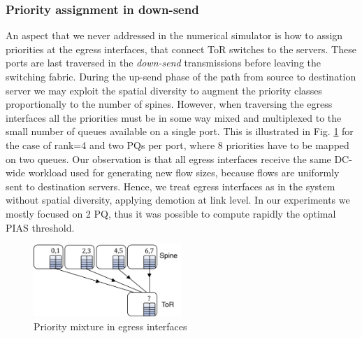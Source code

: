\subsubsection{Priority assignment in down-send}
An aspect that we never addressed in the numerical simulator is how to assign priorities at the egress interfaces, that connect ToR switches to the servers. These ports are last traversed in the \emph{down-send} transmissions before leaving the switching fabric. During the up-send phase of the path from source to destination server we may exploit the spatial diversity to augment the priority classes proportionally to the number of spines. However, when traversing the egress interfaces all the priorities must be in some way mixed and multiplexed to the small number of queues available on a single port. This is illustrated in Fig. \ref{fig:downsend} for the case of rank=4 and two PQs per port, where 8 priorities have to be mapped on two queues. Our observation is that all egress interfaces receive the same DC-wide workload used for generating new flow sizes, because flows are uniformly sent to destination servers. Hence, we treat egress interfaces as in the system without spatial diversity, applying demotion at link level. In our experiments we mostly focused on 2 PQ, thus it was possible to compute rapidly the optimal PIAS threshold.
\begin{figure}
	\centering	
	\includegraphics[width=0.5\textwidth]{Chapter4/Figures/downsend}
	\caption{Priority mixture in egress interfaces}
	\label{fig:downsend}
\end{figure}%
